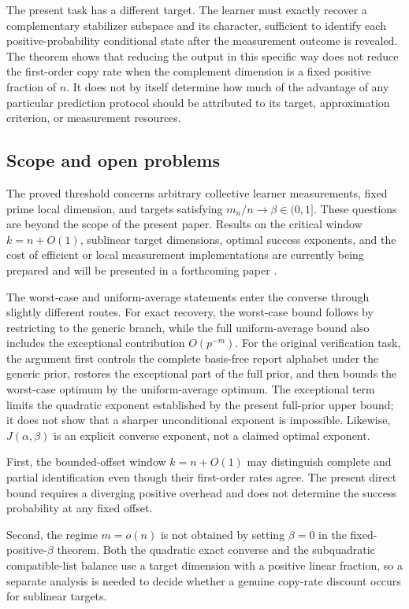 \documentclass[11pt]{article}
\newcommand{\1}{\mathbf 1}
\theoremstyle{plain}
\theoremstyle{definition}
\theoremstyle{remark}
\begin{document}
The present task has a different target.  The learner must exactly recover a  
complementary stabilizer subspace and its character, sufficient to identify  
each positive-probability conditional state after the measurement outcome is  
revealed.  The theorem shows that reducing the output in this specific way  
does not reduce the first-order copy rate when the complement dimension is a  
fixed positive fraction of $n$.  It does not by itself determine how much of  
the advantage of any particular prediction protocol should be attributed to  
its target, approximation criterion, or measurement resources.  

\subsection{Scope and open problems}  
The proved threshold concerns arbitrary collective learner measurements, fixed  
prime local dimension, and targets satisfying  
$m_n/n\to\beta\in(0,1]$.  
These questions are beyond the scope of the present paper. Results on the critical window $k=n+O(1)$, sublinear target dimensions, optimal success exponents, and the cost of efficient or local measurement implementations are currently being prepared and will be presented in a forthcoming paper \cite{Pre}.

The worst-case and uniform-average statements enter the converse through  
slightly different routes.  For exact recovery, the worst-case bound follows  
by restricting to the generic branch, while the full uniform-average bound  
also includes the exceptional contribution $O(p^{-m})$.  For the original  
verification task, the argument first controls the complete basis-free report  
alphabet under the generic prior, restores the exceptional part of the full  
prior, and then bounds the worst-case optimum by the uniform-average optimum.  
The exceptional term limits the quadratic exponent established by the present  
full-prior upper bound; it does not show that a sharper unconditional exponent  
is impossible.  Likewise, $J(\alpha,\beta)$ is an explicit converse exponent,  
not a claimed optimal exponent.  

First, the bounded-offset window $k=n+O(1)$ may distinguish complete and  
partial identification even though their first-order rates agree.  The present  
direct bound requires a diverging positive overhead and does not determine the  
success probability at any fixed offset.  

Second, the regime $m=o(n)$ is not obtained by setting $\beta=0$ in the  
fixed-positive-$\beta$ theorem.  Both the quadratic exact converse and the  
subquadratic compatible-list balance use a target dimension with a positive  
linear fraction, so a separate analysis is needed to decide whether a genuine  
copy-rate discount occurs for sublinear targets.  
\end{document}
